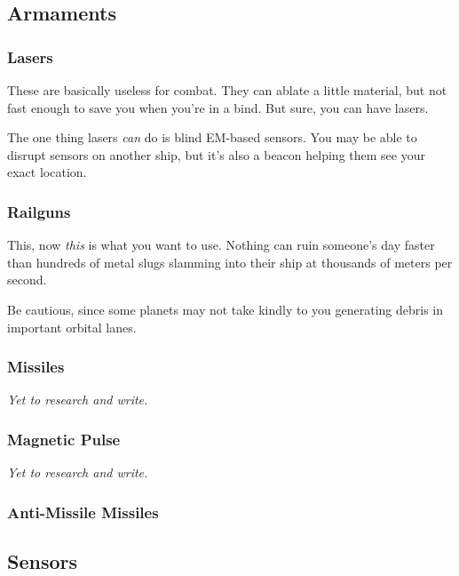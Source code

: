 \subsection{Armaments}

\subsubsection{Lasers}
\par
These are basically useless for combat. They can ablate a little material, but not fast enough to save you when you're in a bind. But sure, you can have lasers.

\par
The one thing lasers \textit{can} do is blind EM-based sensors. You may be able to disrupt sensors on another ship, but it's also a beacon helping them see your exact location.


\subsubsection{Railguns}
\par
This, now \textit{this} is what you want to use. Nothing can ruin someone's day faster than hundreds of metal slugs slamming into their ship at thousands of meters per second.

\par
Be cautious, since some planets may not take kindly to you generating debris in important orbital lanes.


\subsubsection{Missiles}

\textit{Yet to research and write.}

\subsubsection{Magnetic Pulse}

\textit{Yet to research and write.}

\subsubsection{Anti-Missile Missiles}

\subsection{Sensors}

